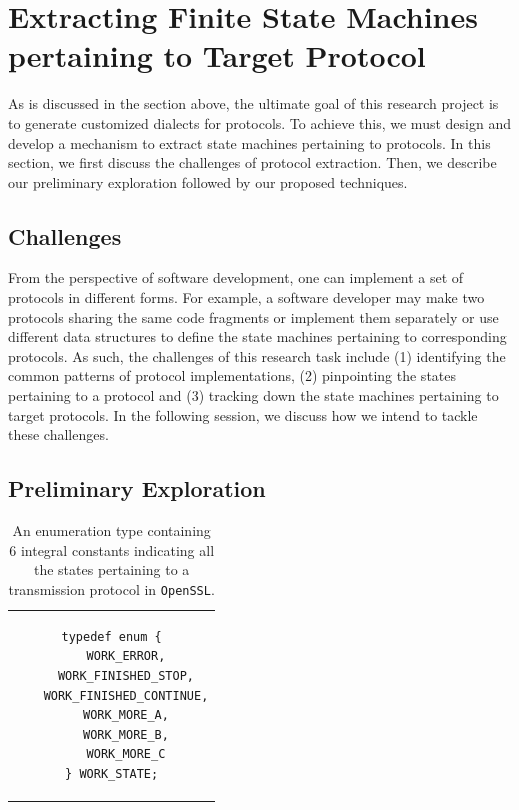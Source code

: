 \section{Extracting Finite State Machines pertaining to Target Protocol}
\label{sec:subsetting}

As is discussed in the section above, the ultimate goal of this research project
is to generate customized dialects for protocols. To achieve this, we must
design and develop a mechanism to extract state machines pertaining to
protocols. In this section, we first discuss the challenges of protocol
extraction. Then, we describe our preliminary exploration followed by our
proposed techniques.

\subsection{Challenges}

From the perspective of software development, one can implement a
set of protocols in different forms. For example, a software developer may make
two protocols sharing the same code fragments or implement them separately or
use different data structures to define the state machines pertaining to
corresponding protocols. As such, the challenges of this research task include
(1) identifying the common patterns of protocol implementations, (2) pinpointing
the states pertaining to a protocol and (3) tracking down the state machines
pertaining to target protocols. In the following session, we discuss how we
intend to tackle these challenges.

\subsection{Preliminary Exploration}
\label{sec:task1:obs}

\begin{table}
\centering
\begin{tabular}{c}
\hspace{12pt}

\begin{lstlisting}  
typedef enum {
    WORK_ERROR,
    WORK_FINISHED_STOP,
    WORK_FINISHED_CONTINUE,
    WORK_MORE_A,
    WORK_MORE_B,
    WORK_MORE_C
} WORK_STATE;
\end{lstlisting}

\end{tabular}
\caption{An enumeration type containing 6 integral constants indicating all the states pertaining to a
transmission protocol in \texttt{OpenSSL}.}
\label{code:enum}
\end{table} 

